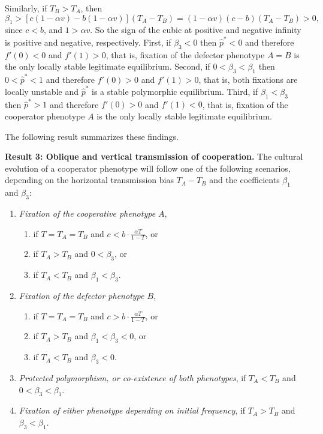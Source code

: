 \documentclass[12pt]{extarticle}
\begin{document}
Similarly, if $T_B>T_A$, then
\begin{equation} \label{eq:beta1_rev}
   \beta_1 > [c(1-\alpha v) - b(1-\alpha v)] (T_A-T_B) 
   = (1-\alpha v)(c-b)(T_A-T_B) > 0,
 \end{equation}
since $c<b$, and $1>\alpha v$. So the sign of the cubic at positive and negative infinity is positive and negative, respectively. 
First, if $\beta_3<0$ then $\hat{p}^*<0$ and therefore $f'(0)<0$ and $f'(1)>0$, that is, fixation of the defector phenotype $A=B$ is the only locally stable legitimate equilibrium.
Second, if $0<\beta_3<\beta_1$ then $0<\hat{p}^*<1$ and therefore $f'(0)>0$ and $f'(1)>0$, that is, both fixations are locally unstable and $\hat{p}^*$ is a stable polymorphic equilibrium.
Third, if $\beta_1<\beta_3$ then $\hat{p}^*>1$ and therefore $f'(0)>0$ and $f'(1)<0$, that is, fixation of the cooperator phenotype $A$ is the only locally stable legitimate equilibrium.

The following result summarizes these findings.

\textbf{Result 3: Oblique and vertical transmission of cooperation.}
The cultural evolution of a cooperator phenotype will follow one of the following scenarios, depending on the horizontal transmission bias $T_A-T_B$ and the coefficients $\beta_1$ and $\beta_3$:
\begin{enumerate}
\item \emph{Fixation of the cooperative phenotype $A$}, 
\begin{enumerate}
\item if $T=T_A=T_B$ and $c < b\cdot \frac{\alpha T}{1-T}$, or
\item if $T_A>T_B$ and $0<\beta_3$, or 
\item if $T_A<T_B$ and $\beta_1<\beta_3$.
\end{enumerate}

\item \emph{Fixation of the defector phenotype $B$}, 
\begin{enumerate}
\item if $T=T_A=T_B$ and $c > b\cdot \frac{\alpha T}{1-T}$, or 
\item if $T_A>T_B$ and $\beta_1<\beta_3<0$, or 
\item if $T_A<T_B$ and $\beta_3<0$.
\end{enumerate}

\item \emph{Protected polymorphism, or co-existence of both phenotypes}, if $T_A < T_B$ and $0<\beta_3<\beta_1$.

\item \emph{Fixation of either phenotype depending on initial frequency}, if $T_A>T_B$ and $\beta_3<\beta_1$.

\end{enumerate}
\end{document}
